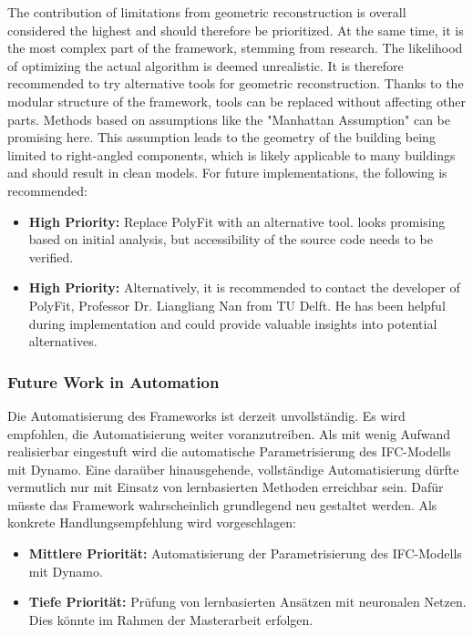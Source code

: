 \begin{English}
    The contribution of limitations from geometric reconstruction is overall considered the highest and should therefore be prioritized. At the same time, it is the most complex part of the framework, stemming from research. The likelihood of optimizing the actual algorithm is deemed unrealistic. It is therefore recommended to try alternative tools for geometric reconstruction. Thanks to the modular structure of the framework, tools can be replaced without affecting other parts. Methods based on assumptions like the "Manhattan Assumption" can be promising here. This assumption leads to the geometry of the building being limited to right-angled components, which is likely applicable to many buildings and should result in clean models. For future implementations, the following is recommended:

    \begin{itemize}
        \item \textbf{High Priority:} Replace PolyFit with an alternative tool. \cite{wangReconstructionLoD2Building2023} looks promising based on initial analysis, but accessibility of the source code needs to be verified.
        \item \textbf{High Priority:} Alternatively, it is recommended to contact the developer of PolyFit, Professor Dr. Liangliang Nan from TU Delft. He has been helpful during implementation and could provide valuable insights into potential alternatives.
    \end{itemize}
\end{English}

\subsubsection{Future Work in Automation}
\begin{German}
    Die Automatisierung des Frameworks ist derzeit unvollständig. Es wird empfohlen, die Automatisierung weiter voranzutreiben. Als mit wenig Aufwand realisierbar eingestuft wird die automatische Parametrisierung des IFC-Modells mit Dynamo. Eine daraüber hinausgehende, vollständige Automatisierung dürfte vermutlich nur mit Einsatz von lernbasierten Methoden erreichbar sein. Dafür müsste das Framework wahrscheinlich grundlegend neu gestaltet werden. Als konkrete Handlungsempfehlung wird vorgeschlagen:

    \begin{itemize}
        \item \textbf{Mittlere Priorität:} Automatisierung der Parametrisierung des IFC-Modells mit Dynamo.
        \item \textbf{Tiefe Priorität:} Prüfung von lernbasierten Ansätzen mit neuronalen Netzen. Dies könnte im Rahmen der Masterarbeit erfolgen.
    \end{itemize}
\end{German}

